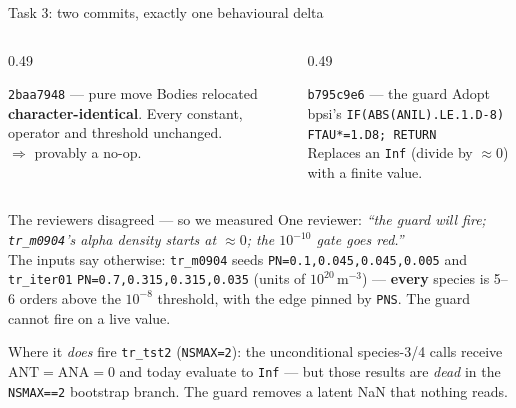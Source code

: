 \documentclass[10pt,aspectratio=169]{beamer}
\newcommand{\C}[1]{\texttt{\small #1}}          %
\begin{document}
\begin{frame}{Task 3: two commits, exactly one behavioural delta}

\begin{columns}[T]
\begin{column}{0.49\textwidth}
\begin{block}{\C{2baa7948} --- pure move}
Bodies relocated \textbf{character-identical}. Every constant, operator and threshold unchanged.\\[0.3em]
$\Rightarrow$ provably a no-op.
\end{block}
\end{column}
\begin{column}{0.49\textwidth}
\begin{block}{\C{b795c9e6} --- the guard}
Adopt bpsi's
\C{IF(ABS(ANIL).LE.1.D-8) FTAU*=1.D8; RETURN}\\[0.2em]
Replaces an \C{Inf} (divide by $\approx 0$) with a finite value.
\end{block}
\end{column}
\end{columns}

\vspace{0.5em}
\begin{alertblock}{The reviewers disagreed --- so we measured}
One reviewer: \emph{``the guard will fire; \C{tr\_m0904}'s alpha density starts at $\approx 0$; the
$10^{-10}$ gate goes red.''}\\[0.2em]
The inputs say otherwise: \C{tr\_m0904} seeds \C{PN=0.1,0.045,0.045,0.005} and \C{tr\_iter01}
\C{PN=0.7,0.315,0.315,0.035} (units of $10^{20}\,\mathrm{m^{-3}}$) --- \textbf{every} species is 5--6 orders
above the $10^{-8}$ threshold, with the edge pinned by \C{PNS}. The guard cannot fire on a live value.
\end{alertblock}

\vspace{0.2em}
\begin{block}{Where it \emph{does} fire}
\C{tr\_tst2} (\C{NSMAX=2}): the unconditional species-3/4 calls receive $\mathrm{ANT}=\mathrm{ANA}=0$ and
today evaluate to \C{Inf} --- but those results are \emph{dead} in the \C{NSMAX==2} bootstrap branch.
The guard removes a latent NaN that nothing reads.
\end{block}
\end{frame}
\end{document}
